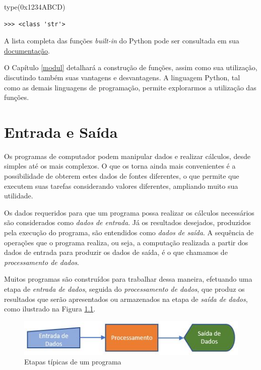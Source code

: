 \documentclass[
]{book}
\newenvironment{Shaded}{\begin{snugshade}}{\end{snugshade}}
\newcommand{\BuiltInTok}[1]{#1}
\newcommand{\NormalTok}[1]{#1}
\newcommand{\StringTok}[1]{\textcolor[rgb]{0.31,0.60,0.02}{#1}}
\begin{document}
\begin{Shaded}
\begin{Highlighting}[]
\BuiltInTok{type}\NormalTok{(}\StringTok{\textquotesingle{}0x1234ABCD\textquotesingle{}}\NormalTok{)}
\end{Highlighting}
\end{Shaded}

\begin{verbatim}
>>> <class 'str'>
\end{verbatim}

A lista completa das funções \emph{built-in} do Python pode ser consultada em sua \href{https://docs.python.org/3/library/functions.html}{documentação}.

O Capítulo \ref{modul} detalhará a construção de funções, assim como sua utilização, discutindo também suas vantagens e desvantagens. A linguagem Python, tal como as demais linguagens de programação, permite explorarmos a utilização das funções.

\hypertarget{e-s}{%
\chapter{Entrada e Saída}\label{e-s}}

Os programas de computador podem manipular dados e realizar cálculos, desde simples até os mais complexos. O que os torna ainda mais convenientes é a possibilidade de obterem estes dados de fontes diferentes, o que permite que executem suas tarefas considerando valores diferentes, ampliando muito sua utilidade.

Os dados requeridos para que um programa possa realizar os cálculos necessários são considerados como \emph{dados de entrada}. Já os resultados desejados, produzidos pela execução do programa, são entendidos como \emph{dados de saída}. A sequência de operações que o programa realiza, ou seja, a computação realizada a partir dos dados de entrada para produzir os dados de saída, é o que chamamos de \emph{processamento de dados}.

Muitos programas são construídos para trabalhar dessa maneira, efetuando uma etapa de \emph{entrada de dados}, seguida do \emph{processamento de dados}, que produz os resultados que serão apresentados ou armazenados na etapa de \emph{saída de dados}, como ilustrado na Figura \ref{fig:03-01}.

\begin{figure}
\centering
\includegraphics{images/03-01.jpg}
\caption{\label{fig:03-01}Etapas típicas de um programa}
\end{figure}
\end{document}
